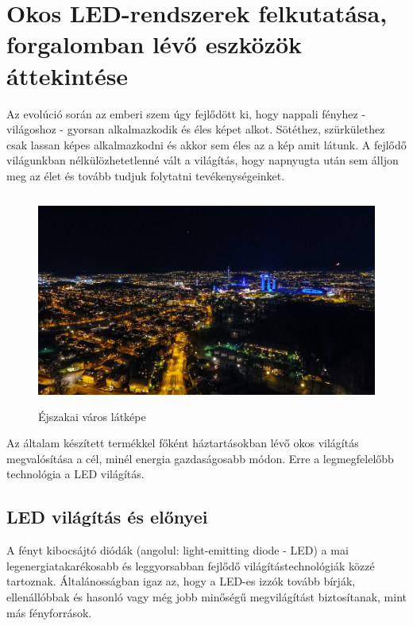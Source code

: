 \documentclass[../main.tex]{subfiles}
\begin{document}
\section{Okos LED-rendszerek felkutatása, forgalomban lévő eszközök áttekintése}
    Az evolúció során az emberi szem úgy fejlődött ki, hogy nappali fényhez - világoshoz - gyorsan alkalmazkodik és éles képet alkot. Sötéthez, szürkülethez csak lassan képes alkalmazkodni és akkor sem éles az a kép amit látunk. A fejlődő világunkban nélkülözhetetlenné vált a világítás, hogy napnyugta után sem álljon meg az élet és tovább tudjuk folytatni tevékenységeinket.
    \begin{figure}[h!] %
        \centering
        \includegraphics[height=7cm]{irodalom_res/night_life.jpg}
        \caption{Éjszakai város látképe} %
    \end{figure}
    
    Az általam készített termékkel főként háztartásokban lévő okos világítás megvalósítása a cél, minél energia gazdaságosabb módon. Erre a legmegfelelőbb technológia a LED világítás.
    
    \subsection{LED világítás és előnyei} %
    
    A fényt kibocsájtó diódák (angolul: light-emitting diode - LED) a mai legenergiatakarékosabb és leggyorsabban fejlődő világítástechnológiák közzé tartoznak. Általánosságban igaz az, hogy a LED-es izzók tovább bírják, ellenállóbbak és hasonló vagy még jobb minőségű megvilágítást biztosítanak, mint más fényforrások.
    
\end{document}
